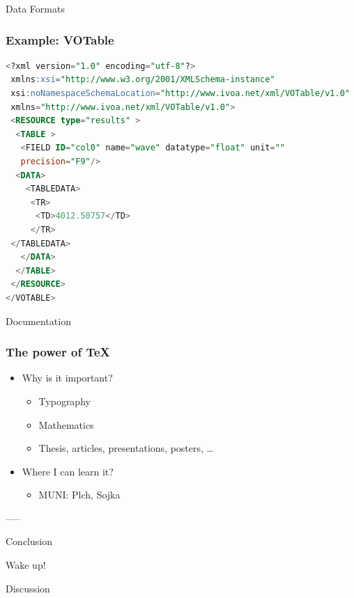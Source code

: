 \documentclass[fleqn]{beamer}
\begin{document}
\begin{section}{Data Formats}
\begin{frame}[containsverbatim]\frametitle{Example: VOTable}
\begin{lstlisting}[language=SQL]
<?xml version="1.0" encoding="utf-8"?>
 xmlns:xsi="http://www.w3.org/2001/XMLSchema-instance"
 xsi:noNamespaceSchemaLocation="http://www.ivoa.net/xml/VOTable/v1.0"
 xmlns="http://www.ivoa.net/xml/VOTable/v1.0">
 <RESOURCE type="results" >
  <TABLE >
   <FIELD ID="col0" name="wave" datatype="float" unit=""
   precision="F9"/>
  <DATA>
    <TABLEDATA>
     <TR>
      <TD>4012.50757</TD>
     </TR>
 </TABLEDATA>
   </DATA>
  </TABLE>
 </RESOURCE>
</VOTABLE>
\end{lstlisting}
\end{frame}






\end{section}



\begin{section}{Documentation}
  \begin{frame}\frametitle{The power of \TeX}
  \begin{itemize}
    \item{Why is it important?}
      \begin{itemize}
      \item Typography
      \item Mathematics
      \item Thesis, articles, presentations, posters, \ldots
      \end{itemize}
    \item{Where I can learn it?}
      \begin{itemize}
      \item MUNI: Plch, Sojka
      \end{itemize}
  \end{itemize}

\end{frame}

\end{section}
-----



\begin{section}{Conclusion}
\begin{frame}
  \begin{center}
 \huge{Wake up!}

 \bigskip

 \huge Discussion   
  \end{center}
\end{frame}
\end{section}
\end{document}
